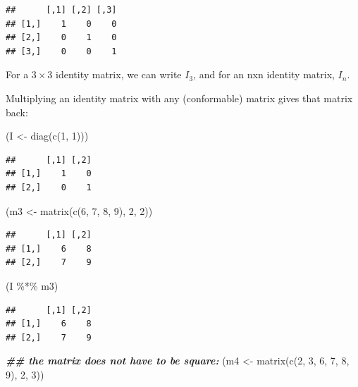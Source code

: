 \documentclass[
  12pt,
]{krantz}
\newenvironment{Shaded}{\begin{snugshade}}{\end{snugshade}}
\newcommand{\DecValTok}[1]{\textcolor[rgb]{0.00,0.00,0.81}{#1}}
\newcommand{\DocumentationTok}[1]{\textcolor[rgb]{0.56,0.35,0.01}{\textbf{\textit{#1}}}}
\newcommand{\FunctionTok}[1]{\textcolor[rgb]{0.00,0.00,0.00}{#1}}
\newcommand{\NormalTok}[1]{#1}
\newcommand{\OtherTok}[1]{\textcolor[rgb]{0.56,0.35,0.01}{#1}}
\newcommand{\SpecialCharTok}[1]{\textcolor[rgb]{0.00,0.00,0.00}{#1}}
\theoremstyle{definition}
\theoremstyle{definition}
\theoremstyle{definition}
\theoremstyle{definition}
\theoremstyle{remark}
\begin{document}
\begin{verbatim}
##      [,1] [,2] [,3]
## [1,]    1    0    0
## [2,]    0    1    0
## [3,]    0    0    1
\end{verbatim}

For a \(3\times 3\) identity matrix, we can write \(I_3\), and for an nxn identity matrix, \(I_n\).

Multiplying an identity matrix with any (conformable) matrix gives that matrix back:

\begin{Shaded}
\begin{Highlighting}[]
\NormalTok{(I }\OtherTok{\textless{}{-}} \FunctionTok{diag}\NormalTok{(}\FunctionTok{c}\NormalTok{(}\DecValTok{1}\NormalTok{, }\DecValTok{1}\NormalTok{)))}
\end{Highlighting}
\end{Shaded}

\begin{verbatim}
##      [,1] [,2]
## [1,]    1    0
## [2,]    0    1
\end{verbatim}

\begin{Shaded}
\begin{Highlighting}[]
\NormalTok{(m3 }\OtherTok{\textless{}{-}} \FunctionTok{matrix}\NormalTok{(}\FunctionTok{c}\NormalTok{(}\DecValTok{6}\NormalTok{, }\DecValTok{7}\NormalTok{, }\DecValTok{8}\NormalTok{, }\DecValTok{9}\NormalTok{), }\DecValTok{2}\NormalTok{, }\DecValTok{2}\NormalTok{))}
\end{Highlighting}
\end{Shaded}

\begin{verbatim}
##      [,1] [,2]
## [1,]    6    8
## [2,]    7    9
\end{verbatim}

\begin{Shaded}
\begin{Highlighting}[]
\NormalTok{(I }\SpecialCharTok{\%*\%}\NormalTok{ m3)}
\end{Highlighting}
\end{Shaded}

\begin{verbatim}
##      [,1] [,2]
## [1,]    6    8
## [2,]    7    9
\end{verbatim}

\begin{Shaded}
\begin{Highlighting}[]
\DocumentationTok{\#\# the matrix does not have to be square:}
\NormalTok{(m4 }\OtherTok{\textless{}{-}} \FunctionTok{matrix}\NormalTok{(}\FunctionTok{c}\NormalTok{(}\DecValTok{2}\NormalTok{, }\DecValTok{3}\NormalTok{, }\DecValTok{6}\NormalTok{, }\DecValTok{7}\NormalTok{, }\DecValTok{8}\NormalTok{, }\DecValTok{9}\NormalTok{), }\DecValTok{2}\NormalTok{, }\DecValTok{3}\NormalTok{))}
\end{Highlighting}
\end{Shaded}
\end{document}
